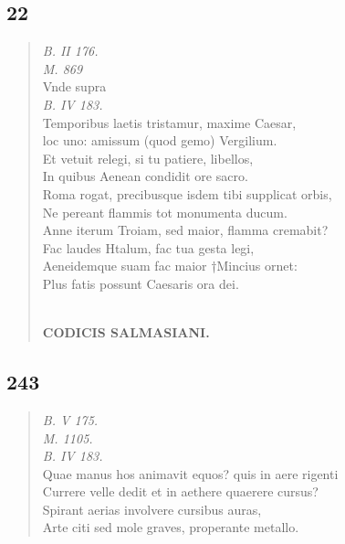 \documentclass[11pt, a4paper]{report}
\begin{document}
            \subsection*{22}
      \begin{verse}
      \textit{B. II 176.} \\ \textit{M. 869} \\ Vnde supra \\ \textit{B. IV 183.} \\ Temporibus laetis tristamur, maxime Caesar, \\ loc uno: amissum (quod gemo) Vergilium. \\ Et vetuit relegi, si tu patiere, libellos, \\ In quibus Aenean condidit ore sacro. \\ Roma rogat, precibusque isdem tibi supplicat orbis, \\ Ne pereant flammis tot monumenta ducum. \\ Anne iterum Troiam, sed maior, flamma cremabit? \\ Fac laudes Htalum, fac tua gesta legi, \\ Aeneidemque suam fac maior †Mincius ornet: \\ Plus fatis possunt Caesaris ora dei. \\ 
        ﻿\pagebreak 
    \begin{center} \textbf{CODICIS SALMASIANI.} \end{center} \marginpar{[199]} 
      \end{verse}
  
            \subsection*{243}
      \begin{verse}
      \textit{B. V 175.} \\ \textit{M. 1105.} \\ \textit{B. IV 183.} \\ Quae manus hos animavit equos? quis  \lbrack in \rbrack  aere rigenti \\ Currere velle dedit et in aethere quaerere cursus? \\ Spirant aerias involvere cursibus auras, \\ Arte citi sed mole graves, properante metallo. \\ 
      \end{verse}
  
\end{document}
